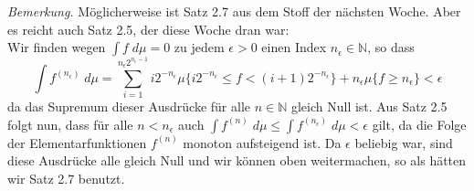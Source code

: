 \documentclass[10pt]{article}
\begin{document}
\textit{Bemerkung. }  Möglicherweise ist Satz 2.7 aus dem Stoff der nächsten Woche. Aber es reicht auch Satz 2.5, der diese Woche dran war: \\
Wir finden wegen $\int f \; d\mu = 0$ zu jedem $\epsilon > 0$ einen Index $n_\epsilon \in \mathbb{N}$, so dass 
$$
\int f^{(n_\epsilon)} \; d\mu = \sum_{i=1}^{n_\epsilon2^{n_\epsilon-1}} i2^{-n_\epsilon} \mu\{i2^{-n_\epsilon} \leq f < (i+1)2^{-n_\epsilon}\} + n_\epsilon \mu\{f \geq n_\epsilon\} < \epsilon
$$
da das Supremum dieser Ausdrücke für alle $n \in \mathbb{N}$ gleich Null ist. Aus Satz 2.5 folgt nun, dass für alle $n < n_\epsilon$ auch $\int f^{(n)} \; d\mu  \leq \int f^{(n_\epsilon)} \; d\mu < \epsilon$ gilt, da die Folge der Elementarfunktionen $f^{(n)}$ monoton aufsteigend ist. 
Da $\epsilon$ beliebig war, sind diese Ausdrücke alle gleich Null und wir können oben weitermachen, so als hätten wir Satz 2.7 benutzt.
\end{document}

